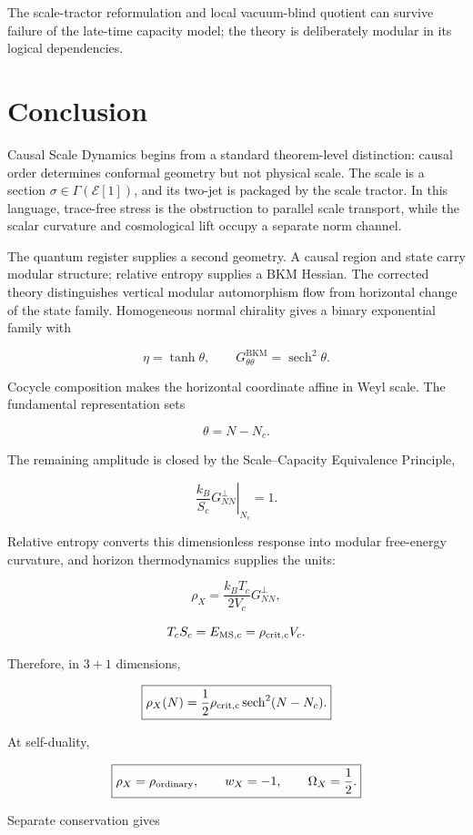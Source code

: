 \documentclass[
  11pt,
  letterpaper,
]{article}
\begin{document}
The scale-tractor reformulation and local vacuum-blind quotient can
survive failure of the late-time capacity model; the theory is
deliberately modular in its logical dependencies.

\section{Conclusion}\label{conclusion}

Causal Scale Dynamics begins from a standard theorem-level distinction:
causal order determines conformal geometry but not physical scale. The
scale is a section \(\sigma\in\Gamma(\mathcal E[1])\), and its two-jet
is packaged by the scale tractor. In this language, trace-free stress is
the obstruction to parallel scale transport, while the scalar curvature
and cosmological lift occupy a separate norm channel.

The quantum register supplies a second geometry. A causal region and
state carry modular structure; relative entropy supplies a BKM Hessian.
The corrected theory distinguishes vertical modular automorphism flow
from horizontal change of the state family. Homogeneous normal chirality
gives a binary exponential family with

\[
\eta=\tanh\theta,
\qquad
G^{\mathrm{BKM}}_{\theta\theta}=\operatorname{sech}^2\theta.
\]

Cocycle composition makes the horizontal coordinate affine in Weyl
scale. The fundamental representation sets

\[
\theta=N-N_c.
\]

The remaining amplitude is closed by the Scale--Capacity Equivalence
Principle,

\[
\boxed{
\left.\frac{k_B}{S_c}G^{\perp}_{NN}\right|_{N_c}=1.
}
\]

Relative entropy converts this dimensionless response into modular
free-energy curvature, and horizon thermodynamics supplies the units:

\[
\rho_X=\frac{k_BT_c}{2V_c}G^{\perp}_{NN},
\]

\[
T_cS_c=E_{\rm MS,c}=\rho_{\rm crit,c}V_c.
\]

Therefore, in \(3+1\) dimensions,

\[
\boxed{
\rho_X(N)=\frac12\rho_{\rm crit,c}\operatorname{sech}^2(N-N_c).
}
\]

At self-duality,

\[
\boxed{
\rho_X=\rho_{\rm ordinary},
\qquad
w_X=-1,
\qquad
\Omega_X=\frac12.
}
\]

Separate conservation gives
\end{document}
